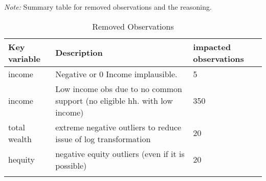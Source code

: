 \documentclass[12pt,a4paper]{article}
\begin{document}
\begin{landscape}
\begin{singlespace}
			\def\sym#1{\ifmmode^{#1}\else\(^{#1}\)\fi}
			\begin{ThreePartTable}
				\begin{TableNotes}
					\begin{scriptsize}
					\item \textit{Note:} Summary table for removed observations and the reasoning. 	
					\end{scriptsize}
				\end{TableNotes}
				
				\begin{longtable}{l C{15cm} C{5cm}}
					\caption{Removed Observations}\label{tab_drop_observations}\\
					\toprule
					Key variable & Description & impacted observations  \\
					\midrule
					income & Negative or 0 Income implausible. & 5 \\
					income & Low income obs due to no common support (no eligible hh. with low income) & 350 \\
				 	total wealth & extreme negative outliers to reduce issue of log transformation & 20 \\
				 	hequity & negative equity outliers (even if it is possible) & 20 \\
					\midrule
					\bottomrule
				\insertTableNotes \\
				\end{longtable} 

				
			\end{ThreePartTable}
\end{singlespace} 
\end{landscape}
\end{document}
